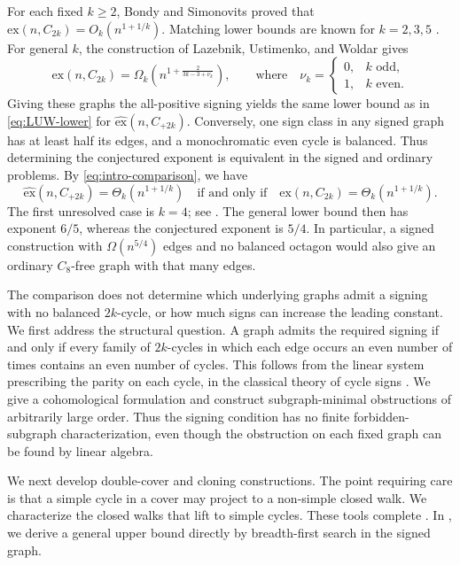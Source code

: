 \documentclass{article}
\newcommand{\ex}{\mathrm{ex}}
\newcommand{\hex}{\widehat{\ex}}
\theoremstyle{definition}
\theoremstyle{remark}
\begin{document}
For each fixed $k\geq2$, Bondy and Simonovits \cite{BondySimonovits74}
proved that $\ex(n,C_{2k})=O_k(n^{1+1/k})$.  Matching lower bounds are
known for $k=2,3,5$
\cite{ErdosRenyiSos66,Benson66,MR1109426}.  For general $k$, the
construction of Lazebnik, Ustimenko, and Woldar \cite{LUW1995} gives
\begin{equation}\label{eq:LUW-lower}
\ex(n,C_{2k})=\Omega_k\!\left(n^{1+\frac{2}{3k-3+\nu_k}}\right),
\qquad \text{where} \quad
\nu_k=\begin{cases}0,&k\text{ odd},\\1,&k\text{ even}.\end{cases}
\end{equation}
Giving these graphs the all-positive signing yields the same lower bound as in \eqref{eq:LUW-lower}
for $\hex(n,C_{+2k})$.  Conversely, one sign class in any signed graph
has at least half its edges, and a monochromatic even cycle is balanced.
Thus determining the conjectured exponent is equivalent in the signed
and ordinary problems. By \eqref{eq:intro-comparison}, we have
\begin{equation}\label{eq:exponent-equivalence}
\hex(n,C_{+2k})=\Theta_k(n^{1+1/k})
\quad \text{if and only if}\quad
\ex(n,C_{2k})=\Theta_k(n^{1+1/k}).
\end{equation}
The first unresolved case is $k=4$; see
\cite{KeevashSudakovVerstraete2013}.  The general lower bound then has
exponent $6/5$, whereas the conjectured exponent is $5/4$.
In particular, a signed construction
with $\Omega(n^{5/4})$ edges and no balanced octagon would also give an
ordinary $C_8$-free graph with that many edges.

The comparison does not determine which underlying graphs admit a signing
with no balanced $2k$-cycle, or how much signs can increase the leading
constant.  We first address the structural question.  A graph admits the
required signing if and only if every family of $2k$-cycles in which each
edge occurs an even number of times contains an even number of cycles.
This follows from the linear system prescribing the parity on each cycle,
in the classical theory of cycle signs \cite{Zaslavsky81}.  We give a
cohomological formulation and construct subgraph-minimal obstructions of
arbitrarily large order.  Thus the signing condition has no finite
forbidden-subgraph characterization, even though the obstruction on each
fixed graph can be found by linear algebra.

We next develop double-cover and cloning constructions.  The point requiring
care is that a simple cycle in a cover may project to a non-simple closed
walk. We characterize the closed walks that lift to simple cycles.  These tools complete
.  In , we derive a general
upper bound directly by breadth-first search in the signed graph.
\end{document}
